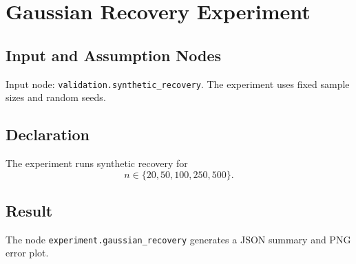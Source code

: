 \section{Gaussian Recovery Experiment}
\label{experiment:gaussian-recovery}

\subsection{Input and Assumption Nodes}
Input node: \texttt{validation.synthetic\_recovery}. The experiment uses fixed sample sizes and random seeds.

\subsection{Declaration}
The experiment runs synthetic recovery for
\[
  n\in\{20,50,100,250,500\}.
\]

\subsection{Result}
The node \texttt{experiment.gaussian\_recovery} generates a JSON summary and PNG error plot.

